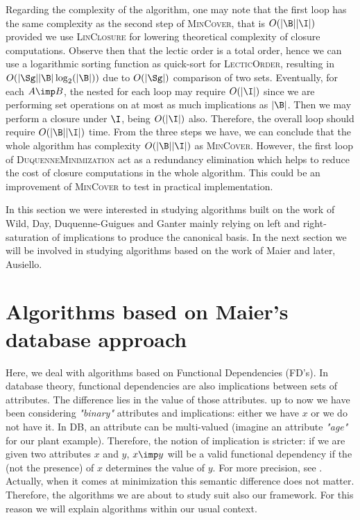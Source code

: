 Regarding the complexity of the algorithm, one may note that the first loop has
the same complexity as the second step of \textsc{MinCover}, that is $O(|\B||\I|)$ provided we use \textsc{LinClosure} for lowering theoretical complexity of closure computations. Observe then that the lectic order is a total order, hence we can use a logarithmic sorting function as quick-sort for
\textsc{LecticOrder}, resulting in $O(|\Sg||\B|\log_2(|\B|))$ due to $O(|\Sg|)$
comparison of two sets. Eventually, for each $A \imp B$, the nested for each loop may require $O(|\I|)$ since we are performing set operations on at most as much implications as $|\B|$. Then we may perform a closure under $\I$, being
$O(|\I|)$ also. Therefore, the overall loop should require $O(|\B||\I|)$ time.
From the three steps we have, we can conclude that the whole algorithm has complexity $O(|\B||\I|)$ as \textsc{MinCover}. However, the first loop of 
\textsc{DuquenneMinimization} act as a redundancy elimination which helps to
reduce the cost of closure computations in the whole algorithm. This could be
an improvement of \textsc{MinCover} to test in practical implementation.

\vspace{1.2em}

In this section we were interested in studying algorithms built on the work of
Wild, Day, Duquenne-Guigues and Ganter mainly relying on left and right-saturation of implications to produce the canonical basis. In the next section we will be involved in studying algorithms based on the work of Maier
and later, Ausiello.




\section{Algorithms based on Maier's database approach}

Here, we deal with algorithms based on Functional Dependencies (FD's). In database theory, functional dependencies are also implications between sets
of attributes. The difference lies in the value of those attributes. up to now we have been considering \textit{"binary"} attributes and implications: either
we have $x$ or we do not have it. In DB, an attribute can be multi-valued (imagine an attribute \textit{"age"} for our plant example). Therefore, the 
notion of implication is stricter: if we are given two attributes $x$ and $y$,
$x \imp y$ will be a valid functional dependency if the  (not the presence) of $x$ determines the value of $y$. For more precision, see \cite{maier_theory_1983}. Actually, when it comes at minimization this semantic difference does not matter. Therefore, the algorithms we are about to study suit also our framework. For this reason we will explain algorithms within our
usual context.

